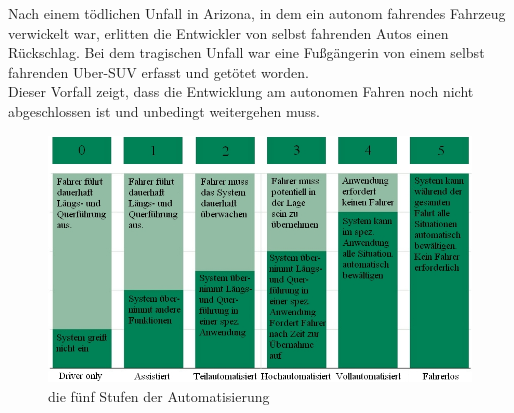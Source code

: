 Nach einem tödlichen Unfall in Arizona, in dem ein autonom fahrendes Fahrzeug verwickelt war, erlitten die Entwickler von selbst fahrenden Autos einen Rückschlag. Bei dem tragischen Unfall war eine Fußgängerin von einem selbst fahrenden Uber-SUV erfasst und getötet worden. \\
Dieser Vorfall zeigt, dass die Entwicklung am autonomen Fahren noch nicht abgeschlossen ist und unbedingt weitergehen muss. 
\begin{figure}[htb]
  \centering  
  \includegraphics[scale=0.4]{img/automatisierungsgrad.jpeg}
  \caption{die fünf Stufen der Automatisierung}
  \label{fig:die fünf Stufen der Automatisierung}
\end{figure}



